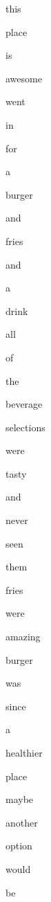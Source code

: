 \documentclass[varwidth]{standalone}
\begin{document}
 \begin{CJK*}{UTF8}{gbsn} 
{\setlength{\fboxsep}{0pt}\colorbox{white!0}{\parbox{0.9\textwidth}{
\colorbox{red!35.060054779052734}{\strut this} 
\colorbox{red!34.78801727294922}{\strut place} 
\colorbox{red!9.39962100982666}{\strut is} 
\colorbox{red!10.265570640563965}{\strut awesome} 
\colorbox{red!100.0}{\strut went} 
\colorbox{red!82.67106628417969}{\strut in} 
\colorbox{red!56.84893035888672}{\strut for} 
\colorbox{red!78.89124298095703}{\strut a} 
\colorbox{red!69.77439880371094}{\strut burger} 
\colorbox{red!55.44631576538086}{\strut and} 
\colorbox{red!38.6969108581543}{\strut fries} 
\colorbox{red!19.034738540649414}{\strut and} 
\colorbox{red!23.68134880065918}{\strut a} 
\colorbox{red!58.87934112548828}{\strut drink} 
\colorbox{red!60.96088790893555}{\strut all} 
\colorbox{red!61.68739700317383}{\strut of} 
\colorbox{red!39.65217208862305}{\strut the} 
\colorbox{red!51.06801986694336}{\strut beverage} 
\colorbox{red!33.771202087402344}{\strut selections} 
\colorbox{red!42.41653823852539}{\strut were} 
\colorbox{red!0.0}{\strut tasty} 
\colorbox{red!6.742565155029297}{\strut and} 
\colorbox{red!62.403385162353516}{\strut never} 
\colorbox{red!38.29966354370117}{\strut seen} 
\colorbox{red!38.59648895263672}{\strut them} 
\colorbox{red!41.596038818359375}{\strut fries} 
\colorbox{red!31.94941520690918}{\strut were} 
\colorbox{red!0.5267059206962585}{\strut amazing} 
\colorbox{red!55.88216018676758}{\strut burger} 
\colorbox{red!29.209856033325195}{\strut was} 
\colorbox{red!55.16347885131836}{\strut since} 
\colorbox{red!16.416940689086914}{\strut a} 
\colorbox{red!13.685202598571777}{\strut healthier} 
\colorbox{red!48.01274108886719}{\strut place} 
\colorbox{red!24.992961883544922}{\strut maybe} 
\colorbox{red!39.10682678222656}{\strut another} 
\colorbox{red!28.33889389038086}{\strut option} 
\colorbox{red!29.495447158813477}{\strut would} 
\colorbox{red!28.568462371826172}{\strut be} 

}}}\end{CJK*}
\end{document}
